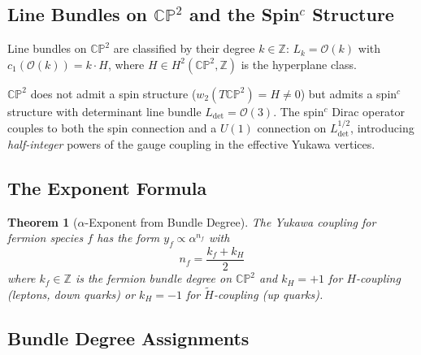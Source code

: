 \documentclass[11pt,a4paper]{article}
\newcommand{\CP}{\mathbb{CP}}
\newcommand{\Z}{\mathbb{Z}}
\newtheorem{theorem}{Theorem}
\theoremstyle{remark}
\begin{document}
\subsection{Line Bundles on $\CP^2$ and the Spin$^c$ Structure}

Line bundles on $\CP^2$ are classified by their degree $k \in \Z$:
$L_k = \mathcal{O}(k)$ with $c_1(\mathcal{O}(k)) = k \cdot H$, where
$H \in H^2(\CP^2, \Z)$ is the hyperplane class.

$\CP^2$ does not admit a spin structure ($w_2(T\CP^2) = H \neq 0$) but
admits a spin$^c$ structure with determinant line bundle
$L_{\det} = \mathcal{O}(3)$.  The spin$^c$ Dirac operator couples to both
the spin connection and a $U(1)$ connection on $L_{\det}^{1/2}$, introducing
\emph{half-integer} powers of the gauge coupling in the effective Yukawa
vertices.

\subsection{The Exponent Formula}

\begin{theorem}[$\alpha$-Exponent from Bundle Degree]
\label{thm:exponent}
The Yukawa coupling for fermion species $f$ has the form
$y_f \propto \alpha^{n_f}$ with
\begin{equation}
\boxed{\quad n_f = \frac{k_f + k_H}{2}\quad}
\label{eq:exponent}
\end{equation}
where $k_f \in \Z$ is the fermion bundle degree on $\CP^2$ and
$k_H = +1$ for $H$-coupling (leptons, down quarks) or $k_H = -1$
for $\widetilde{H}$-coupling (up quarks).
\end{theorem}

\subsection{Bundle Degree Assignments}
\end{document}
